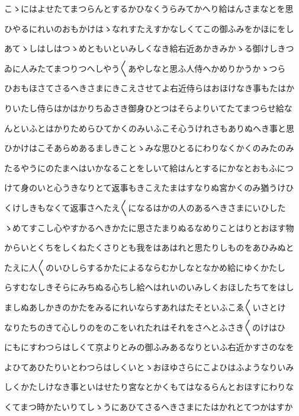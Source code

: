\documentclass[a4paper,11pt,landscape]{ltjtarticle}
\begin{document}
\par\medskip
こゝにはよせたてまつらんとするかひなくうらみてかへり給はんさまなとを思
\par\medskip
ひやるにれいのおもかけはゝなれすたえすかなしくてこの御ふみをかほにをし
\par\medskip
あてゝしはしはつゝめともいといみしくなき給右近あかきみかゝる御けしきつ
\par\medskip
ゐに人みたてまつりつへしやう〱あやしなと思ふ人侍へかめりかうかゝつら
\par\medskip
ひおもほさてさるへきさまにきこえさせてよ右近侍らはおほけなき事もたはか
\par\medskip
りいたし侍らはかはかりちゐさき御身ひとつはそらよりいてたてまつらせ給な
\par\medskip
んといふとはかりためらひてかくのみいふこそ心うけれさもありぬへき事と思
\par\medskip
ひかけはこそあらめあるましきことゝみな思ひとるにわりなくかくのみたのみ
\par\medskip
たるやうにのたまへはいかなることをしいて給はんとするにかなとおもふにつ
\par\medskip
けて身のいと心うきなりとて返事もきこえたまはすなりぬ宮かくのみ猶うけひ
\par\medskip
くけしきもなくて返事さへたえ〱になるはかの人のあるへきさまにいひした
\par\medskip
ゝめてすこし心やすかるへきかたに思さたまりぬるなめりことはりとおほす物
\par\medskip
からいとくちをしくねたくさりとも我をはあはれと思たりしものをあひみぬと
\par\medskip
たえに人〱のいひしらするかたによるならむかしなとなかめ給にゆくかたし
\par\medskip
らすむなしきそらにみちぬる心ちし給へはれいのいみしくおほしたちてをはし
\par\medskip
ましぬあしかきのかたをみるにれいならすあれはたそといふこゑ〱いさとけ
\par\medskip
なりたちのきて心しりのをのこをいれたれはそれをさへとふさき〱のけはひ
\par\medskip
にもにすわつらはしくて京よりとみの御ふみあるなりといふ右近かすさのなを
\par\medskip
よひてあひたりいとわつらはしくいとゝおほゆさらにこよひはふようなりいみ
\par\medskip
しくかたしけなき事といはせたり宮なとかくもてはなるらんとおほすにわりな
\par\medskip
くてまつ時かたいりてしゝうにあひてさるへきさまにたはかれとてつかはすか
\par\medskip
\end{document}
